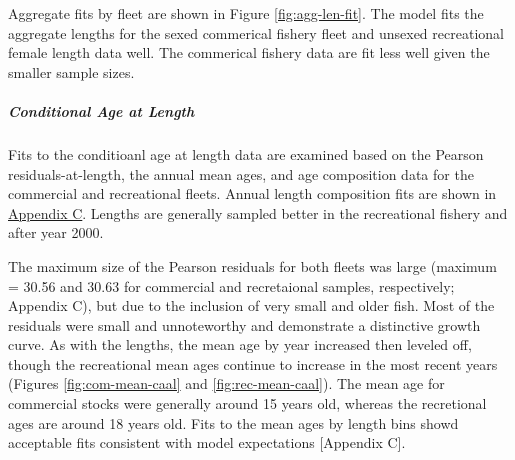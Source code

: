 \documentclass[11pt,
  english,
  a4paper,
]{article}
\begin{document}
\leavevmode\tagmcend\tagstructend\par


Aggregate fits by fleet are shown in Figure \ref{fig:agg-len-fit}. The model fits the aggregate lengths for the sexed commerical fishery fleet and unsexed recreational female length data well. The commerical fishery data are fit less well given the smaller sample sizes.

\leavevmode\tagmcend\tagstructend\par


\hypertarget{conditional-age-at-length}{%
\subparagraph{Conditional Age at Length}\label{conditional-age-at-length}}

\leavevmode\tagmcend\tagstructend


Fits to the conditioanl age at length data are examined based on the Pearson residuals-at-length, the annual mean ages, and age composition data for the commercial and recreational fleets. Annual length composition fits are shown in {\protect\hyperlink{append_c}{Appendix C}\leavevmode\tagmcend\tagstructend}. Lengths are generally sampled better in the recreational fishery and after year 2000.

\leavevmode\tagmcend\tagstructend\par


The maximum size of the Pearson residuals for both fleets was large (maximum = 30.56 and 30.63 for commercial and recretaional samples, respectively; Appendix C), but due to the inclusion of very small and older fish. Most of the residuals were small and unnoteworthy and demonstrate a distinctive growth curve. As with the lengths, the mean age by year increased then leveled off, though the recreational mean ages continue to increase in the most recent years (Figures \ref{fig:com-mean-caal} and \ref{fig:rec-mean-caal}). The mean age for commercial stocks were generally around 15 years old, whereas the recretional ages are around 18 years old. Fits to the mean ages by length bins showd acceptable fits consistent with model expectations {[}Appendix C{]}.

\leavevmode\tagmcend\tagstructend\par
\end{document}
